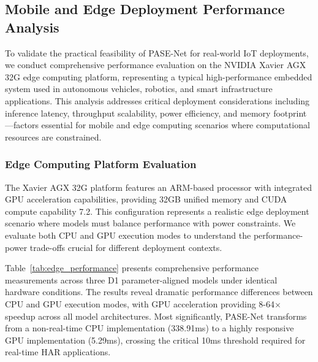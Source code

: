 
\subsection{Mobile and Edge Deployment Performance Analysis}

To validate the practical feasibility of PASE-Net for real-world IoT deployments, we conduct comprehensive performance evaluation on the NVIDIA Xavier AGX 32G edge computing platform, representing a typical high-performance embedded system used in autonomous vehicles, robotics, and smart infrastructure applications. This analysis addresses critical deployment considerations including inference latency, throughput scalability, power efficiency, and memory footprint—factors essential for mobile and edge computing scenarios where computational resources are constrained.

\subsubsection{Edge Computing Platform Evaluation}

The Xavier AGX 32G platform features an ARM-based processor with integrated GPU acceleration capabilities, providing 32GB unified memory and CUDA compute capability 7.2. This configuration represents a realistic edge deployment scenario where models must balance performance with power constraints. We evaluate both CPU and GPU execution modes to understand the performance-power trade-offs crucial for different deployment contexts.

Table~\ref{tab:edge_performance} presents comprehensive performance measurements across three D1 parameter-aligned models under identical hardware conditions. The results reveal dramatic performance differences between CPU and GPU execution modes, with GPU acceleration providing 8-64× speedup across all model architectures. Most significantly, PASE-Net transforms from a non-real-time CPU implementation (338.91ms) to a highly responsive GPU implementation (5.29ms), crossing the critical 10ms threshold required for real-time HAR applications.

